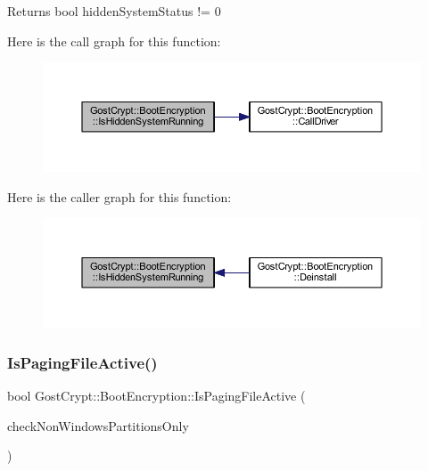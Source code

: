 \begin{DoxyReturn}{Returns}
bool hidden\+System\+Status != 0 
\end{DoxyReturn}
Here is the call graph for this function\+:
\nopagebreak
\begin{figure}[H]
\begin{center}
\leavevmode
\includegraphics[width=350pt]{class_gost_crypt_1_1_boot_encryption_a41ca434ce3526f63bc083f7dab6a1532_cgraph}
\end{center}
\end{figure}
Here is the caller graph for this function\+:
\nopagebreak
\begin{figure}[H]
\begin{center}
\leavevmode
\includegraphics[width=350pt]{class_gost_crypt_1_1_boot_encryption_a41ca434ce3526f63bc083f7dab6a1532_icgraph}
\end{center}
\end{figure}
\mbox{\label{class_gost_crypt_1_1_boot_encryption_a60f1f2b0d4b4ada0e8e42eef381f515b}} 
\subsubsection{\texorpdfstring{Is\+Paging\+File\+Active()}{IsPagingFileActive()}}
{\footnotesize\ttfamily bool Gost\+Crypt\+::\+Boot\+Encryption\+::\+Is\+Paging\+File\+Active (\begin{DoxyParamCaption}\item[{B\+O\+OL}]{check\+Non\+Windows\+Partitions\+Only }\end{DoxyParamCaption})}




